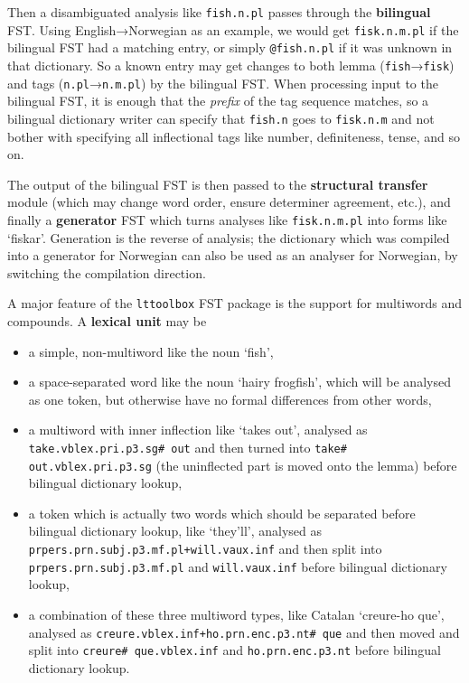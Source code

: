 \documentclass[10pt, a4paper]{article}
\newcommand{\ana}[1]{\texttt{#1}}
\newcommand{\f}[1]{`#1'}
\newcommand{\tool}[1]{\texttt{#1}}
\begin{document}
Then a disambiguated analysis like \ana{fish.n.pl} passes through the
\textbf{bilingual} FST. Using English→Norwegian as an example, we
would get \ana{fisk.n.m.pl} if the bilingual FST had a matching entry,
or simply \ana{@fish.n.pl} if it was unknown in that dictionary. So a
known entry may get changes to both lemma (\ana{fish}→\ana{fisk}) and tags
(\ana{n.pl}→\ana{n.m.pl}) by the bilingual FST. When processing input to
the bilingual FST, it is enough that the \emph{prefix} of the tag
sequence matches, so a bilingual dictionary writer can specify that
\ana{fish.n} goes to \ana{fisk.n.m} and not bother with specifying all
inflectional tags like number, definiteness, tense, and so on.

The output of the bilingual FST is then passed to the
\textbf{structural transfer} module (which may change word order,
ensure determiner agreement, etc.), and finally a \textbf{generator}
FST which turns analyses like \ana{fisk.n.m.pl} into forms like
\f{fiskar}. Generation is the reverse of analysis; the dictionary
which was compiled into a generator for Norwegian can also be used as
an analyser for Norwegian, by switching the compilation direction.

A major feature of the \tool{lttoolbox} FST package is the support
for multiwords and compounds. A \textbf{lexical unit} may be
\begin{itemize}
\item a simple, non-multiword like the noun \f{fish},
\item a space-separated word like the noun \f{hairy frogfish}, which
  will be analysed as one token, but otherwise have no formal
  differences from other words,
\item a multiword with inner inflection like \f{takes out}, analysed
  as \ana{take.vblex.pri.p3.sg\# out} and then turned into \ana{take\#
    out.vblex.pri.p3.sg} (the uninflected part is moved onto the
  lemma) before bilingual dictionary lookup,
\item a token which is actually two words which should be separated
  before bilingual dictionary lookup, like \f{they'll}, analysed as
  \ana{prpers.prn.subj.p3.mf.pl+will.vaux.inf} and then split into
  \ana{prpers.prn.subj.p3.mf.pl} and \ana{will.vaux.inf} before
  bilingual dictionary lookup,
\item a combination of these three multiword types, like Catalan
  \f{creure-ho que}, analysed as
  \ana{creure.vblex.inf+ho.prn.enc.p3.nt\# que} and then moved
  and split into \ana{creure\# que.vblex.inf} and
  \ana{ho.prn.enc.p3.nt} before bilingual dictionary lookup.
\end{itemize}
\end{document}

